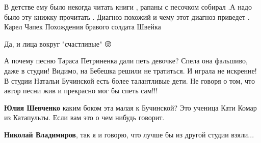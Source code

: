 \begin{itemize}
 

В детстве ему было некогда читать книги , рапаны с песочком собирал .А надо
было эту книжку прочитать . Диагноз похожий и чему этот диагноз приведет .
Карел Чапек Похождения бравого солдата Швейка


 
Да, и лица вокруг "счастливые" 😜

 

А почему песню Тараса Петриненка дали петь девочке? Спела она фальшиво, даже в
студии! Видимо, на Бебешка решили не тратиться. И играла не искренне! В студии
Натальи Бучинской есть более талантливые дети. Не говоря о том, что автор песни
жив и прекрасно мог бы спеть сам!!!

\begin{itemize}
 
\textbf{Юлия Шевченко} каким боком эта малая к Бучинской? Это ученица Кати Комар из Катапульты. Если вам это о чем нибудь говорит.

 
\textbf{Николай Владимиров}, так я и говорю, что лучше бы из другой студии взяли...


 

\end{itemize}
\end{itemize}

